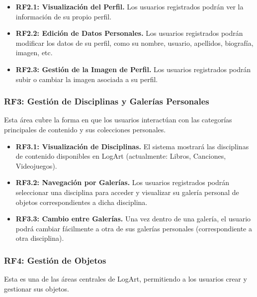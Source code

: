 \begin{itemize}
    \item \textbf{RF2.1: Visualización del Perfil.} Los usuarios registrados podrán ver la información de su propio perfil.
    \item \textbf{RF2.2: Edición de Datos Personales.} Los usuarios registrados podrán modificar los datos de su perfil, como su nombre, usuario, apellidos, biografía, imagen, etc.
    \item \textbf{RF2.3: Gestión de la Imagen de Perfil.} Los usuarios registrados podrán subir o cambiar la imagen asociada a su perfil.
    
\end{itemize}

\subsubsection{RF3: Gestión de Disciplinas y Galerías Personales}
\label{rf:disciplinasGalerias}
Esta área cubre la forma en que los usuarios interactúan con las categorías principales de contenido y sus colecciones personales.

\begin{itemize}
    \item \textbf{RF3.1: Visualización de Disciplinas.} El sistema mostrará las disciplinas de contenido disponibles en LogArt (actualmente: Libros, Canciones, Videojuegos).
    \item \textbf{RF3.2: Navegación por Galerías.} Los usuarios registrados podrán seleccionar una disciplina para acceder y visualizar su galería personal de objetos correspondientes a dicha disciplina.
    \item \textbf{RF3.3: Cambio entre Galerías.} Una vez dentro de una galería, el usuario podrá cambiar fácilmente a otra de sus galerías personales (correspondiente a otra disciplina).
\end{itemize}

\subsubsection{RF4: Gestión de Objetos}
\label{rf:gestionObjetos}
Esta es una de las áreas centrales de LogArt, permitiendo a los usuarios crear y gestionar sus objetos.

